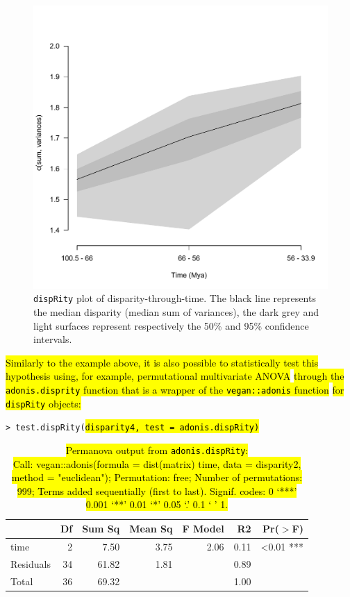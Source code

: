 \documentclass[12pt,letterpaper]{article}
\newcommand{\disp}{\texttt{dispRity} }
\begin{document}
\begin{figure}[!htbp]
\centering
   \includegraphics[width=1\textwidth]{plot_example_time.pdf} 
\caption{\disp plot of disparity-through-time. The black line represents the median disparity (median sum of variances), the dark grey and light surfaces represent respectively the 50\% and 95\% confidence intervals.}
\label{Fig:plot_time}
\end{figure}

\hl{Similarly to the example above, it is also possible to statistically test this hypothesis using, for example, permutational multivariate ANOVA}
 \citep[PERMANOVA; ][]{permanova}
\hl{through the \texttt{adonis.disprity} function that is a wrapper of the \texttt{vegan::adonis} function}
 \citep{oksanen2007vegan}
\hl{ for \texttt{dispRity} objects:}

\noindent \texttt{> test.dispRity(\hl{disparity4, test = adonis.dispRity)}}

\begin{table}[ht]
\centering
\begin{tabular}{lrrrrrr}
  \hline
              & Df & Sum Sq & Mean Sq & F Model & R2   & Pr($>$F) \\ 
  \hline
    time      & 2  &  7.50 & 3.75     & 2.06    & 0.11 & <0.01 *** \\ 
    Residuals & 34 & 61.82 & 1.81     &         & 0.89 & \\
    Total     & 36 & 69.32 &          &         & 1.00 & \\ 
   \hline
\end{tabular}
\caption{
\hl{Permanova output from \texttt{adonis.dispRity}:\\
Call: vegan::adonis(formula = dist(matrix) \texttildelow time, data = disparity2, method = "euclidean"); Permutation: free; Number of permutations: 999; Terms added sequentially (first to last). Signif. codes:  0 `***' 0.001 `**' 0.01 `*' 0.05 `.' 0.1 ` ' 1.}
}
\label{Tab:anova}
\end{table}
\end{document}
